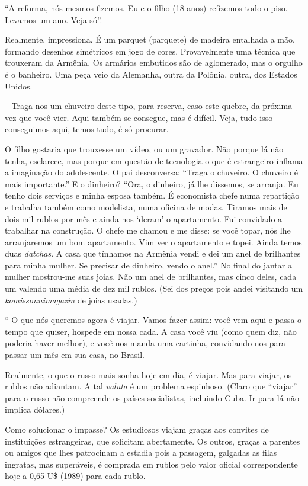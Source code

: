 ``A reforma, nós mesmos fizemos. Eu e o filho (18 anos) refizemos todo o
piso. Levamos um ano. Veja só''.

Realmente, impressiona. É um parquet (parquete) de madeira entalhada a
mão, formando desenhos simétricos em jogo de cores. Provavelmente uma
técnica que trouxeram da Armênia. Os armários embutidos são de
aglomerado, mas o orgulho é o banheiro. Uma peça veio da Alemanha, outra
da Polônia, outra, dos Estados Unidos.

-- Traga-nos um chuveiro deste tipo, para reserva, caso este quebre, da
próxima vez que você vier. Aqui também se consegue, mas é difícil. Veja,
tudo isso conseguimos aqui, temos tudo, é só procurar.

O filho gostaria que trouxesse um vídeo, ou um gravador. Não porque lá
não tenha, esclarece, mas porque em questão de tecnologia o que é
estrangeiro inflama a imaginação do adolescente. O pai desconversa:
``Traga o chuveiro. O chuveiro é mais importante.'' E o dinheiro? ``Ora,
o dinheiro, já lhe dissemos, se arranja. Eu tenho dois serviços e minha
esposa também. É economista chefe numa repartição e trabalha também como
modelista, numa oficina de modas. Tiramos mais de dois mil rublos por
mês e ainda nos `deram' o apartamento. Fui convidado a trabalhar na
construção. O chefe me chamou e me disse: se você topar, nós lhe
arranjaremos um bom apartamento. Vim ver o apartamento e topei. Ainda
temos duas \emph{datchas}. A casa que tínhamos na Armênia vendi e dei um
anel de brilhantes para minha mulher. Se precisar de dinheiro, vendo o
anel.'' No final do jantar a mulher mostrou-me suas joias. Não um anel
de brilhantes, mas cinco deles, cada um valendo uma média de dez mil
rublos. (Sei dos preços pois andei visitando um \emph{komissonnimagazin}
de joias usadas.)

`` O que nós queremos agora é viajar. Vamos fazer assim: você vem aqui e
passa o tempo que quiser, hospede em nossa cada. A casa você viu (como
quem diz, não poderia haver melhor), e você nos manda uma cartinha,
convidando-nos para passar um mês em sua casa, no Brasil.

Realmente, o que o russo mais sonha hoje em dia, é viajar. Mas para
viajar, os rublos não adiantam. A tal \emph{valuta} é um problema
espinhoso. (Claro que ``viajar'' para o russo não compreende os países
socialistas, incluindo Cuba. Ir para lá não implica dólares.)

Como solucionar o impasse? Os estudiosos viajam graças aos convites de
instituições estrangeiras, que solicitam abertamente. Os outros, graças
a parentes ou amigos que lhes patrocinam a estadia pois a passagem,
galgadas as filas ingratas, mas superáveis, é comprada em rublos pelo
valor oficial correspondente hoje a 0,65 U\$ (1989) para cada rublo.

